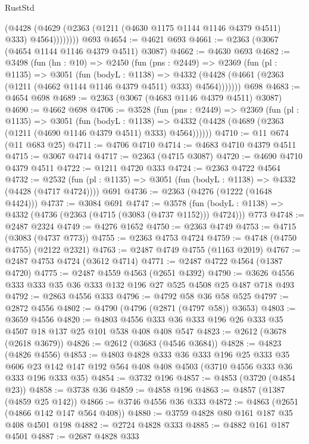 \begin{lexlean}{RustStd}
\begin{coremodule}
              (@4428 (@4629 (@2363 (@1211 (@4630 @1175 @1144 @1146 @4379 @4511) @333) @4564))))))))
    @693
@4654 := @4621 @693
@4661 := @2363 (@3067 (@4654 @1144 @1146 @4379 @4511) @3087)
@4662 := @4630 @693
@4682 := @3498
    (fun (hn : @10) =>
    @2450
      (fun (pns : @2449) =>
      @2369
        (fun (pl : @1135) =>
        @3051
          (fun (bodyL : @1138) =>
          @4332 (@4428 (@4661 (@2363 (@1211 (@4662 @1144 @1146 @4379 @4511) @333) @4564)))))))
    @698
@4683 := @4654 @698
@4689 := @2363 (@3067 (@4683 @1146 @4379 @4511) @3087)
@4690 := @4662 @698
@4706 := @3528
    (fun (pns : @2449) =>
    @2369
      (fun (pl : @1135) =>
      @3051
        (fun (bodyL : @1138) =>
        @4332 (@4428 (@4689 (@2363 (@1211 (@4690 @1146 @4379 @4511) @333) @4564))))))
@4710 := @11 @674 (@11 @683 @25)
@4711 := @4706 @4710
@4714 := @4683 @4710 @4379 @4511
@4715 := @3067 @4714
@4717 := @2363 (@4715 @3087)
@4720 := @4690 @4710 @4379 @4511
@4722 := @1211 @4720 @333
@4724 := @2363 @4722 @4564
@4732 := @2532 (fun (pl : @1135) => @3051 (fun (bodyL : @1138) => @4332 (@4428 (@4717 @4724)))) @691
@4736 := @2363 (@4276 (@1222 (@1648 @4424)))
@4737 := @3084 @691
@4747 := @3578
    (fun (bodyL : @1138) => @4332 (@4736 (@2363 (@4715 (@3083 (@4737 @1152))) @4724)))
    @773
@4748 := @2487 @2324
@4749 := @4276 @1652
@4750 := @2363 @4749
@4753 := @4715 (@3083 (@4737 @773))
@4755 := @2363 @4753 @4724
@4759 := @4748 (@4750 @4755) (@2122 @2321)
@4763 := @2487 @4749 @4755 (@1163 @2019)
@4767 := @2487 @4753 @4724 (@3612 @4714)
@4771 := @2487 @4722 @4564 (@1387 @4720)
@4775 := @2487 @4559 @4563 (@2651 @4392)
@4790 := @3626 @4556 @333 @333 @35 @36 @333 @132 @196 @27 @525 @4508 @25 @487 @718 @493
@4792 := @2863 @4556 @333
@4796 := @4792 @58 @36 @58 @525
@4797 := @2872 @4556
@4802 := @4790 (@4796 (@2871 (@4797 @58)) @3653)
@4803 := @3659 @4556
@4820 := @4803 @4556 @333 @36 @333 @196 @26 @333 @35 @4507 @18 @137 @25 @101 @538 @408 @408 @547
@4823 := @2612 (@3678 (@2618 @3679))
@4826 := @2612 (@3683 (@4546 @3684))
@4828 := @4823 (@4826 @4556)
@4853 := @4803
    @4828
    @333
    @36
    @333
    @196
    @25
    @333
    @35
    @606
    @23
    @142
    @147
    @192
    @564
    @408
    @408
    @4503
    (@3710 @4556 @333 @36 @333 @196 @333 @35)
@4854 := @3732 @196
@4857 := @4853 (@3720 (@4854 @23))
@4858 := @3738 @36
@4859 := @4858 @196
@4863 := @4857 (@1387 (@4859 @25 @142))
@4866 := @3746 @4556 @36 @333
@4872 := @4863 (@2651 (@4866 @142 @147 @564 @408))
@4880 := @3759 @4828 @80 @161 @187 @35 @408 @4501 @198
@4882 := @2724 @4828 @333
@4885 := @4882 @161 @187 @4501
@4887 := @2687 @4828 @333

\end{coremodule}
\end{lexlean}
